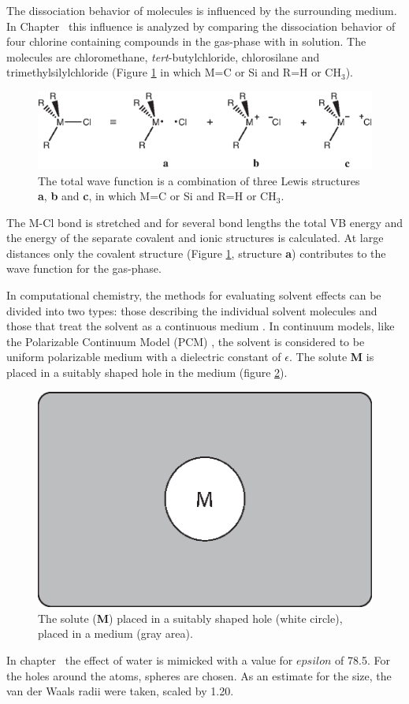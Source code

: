 The dissociation behavior of molecules is influenced by the surrounding medium. In Chapter \chdissociation\ this influence is analyzed by comparing the dissociation behavior of four chlorine containing compounds in the gas-phase with in solution. The molecules are chloromethane, \textit{tert}-butylchloride, chlorosilane and trimethylsilylchloride (Figure \ref{ch1.fig.structures1} in which M=C or Si and R=H or CH$_3$).
\begin{figure}[htbp]
\center
\includegraphics{introduction/figures/structures.eps}
\caption{The total wave function is a combination of three Lewis structures \textbf{a}, \textbf{b} and \textbf{c}, in which M=C or Si and R=H or CH$_3$.}
\label{ch1.fig.structures1}
\end{figure}
The M-Cl bond  is stretched and for several bond lengths the total VB energy and the energy of the separate covalent and ionic structures is calculated. At large distances only the covalent structure (Figure \ref{ch1.fig.structures1}, structure \textbf{a}) contributes to the wave function for the gas-phase. 
 
In computational chemistry, the methods for evaluating solvent effects can be divided into two types: those describing the individual solvent molecules and those that treat the solvent as a continuous medium \cite{jensen}. In continuum models, like the Polarizable Continuum Model (PCM) \cite{pcm1,pcm2}, the solvent is considered to be uniform polarizable medium with a dielectric constant of $\epsilon$. The solute \textbf{M} is placed in a suitably shaped hole in the medium (figure \ref{ch1.fig.continuum}).
\begin{figure}
\center
\includegraphics[scale=0.6]{introduction/figures/continuum.eps}
\caption{The solute (\textbf{M}) placed in a suitably shaped hole (white circle), placed in a medium (gray area).}
\label{ch1.fig.continuum}
\end{figure}
In chapter \chdissociation\ the effect of water is mimicked with a value for $epsilon$ of 78.5. For the holes around the atoms, spheres are chosen. As an estimate for the size, the van der Waals radii were taken, scaled by 1.20. 

